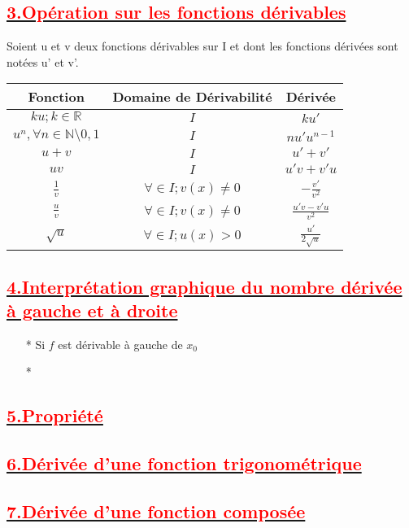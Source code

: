 \documentclass[12pt]{article}
\begin{document}
\subsection*{\underline{\textbf{\textcolor{red}{3.Opération sur les fonctions dérivables}}}}
Soient u et v deux fonctions dérivables sur I et dont les fonctions dérivées sont notées u' et v'.
\begin{center}
\begin{tabular}{|c|c|c|}
\hline
Fonction &Domaine de Dérivabilité &  Dérivée   \\
\hline
$ku;k\in \mathbb{R}$& $I$ & $ku'$ \\
\hline
$u^{n}, \forall n \in \mathbb{N}\setminus{0,1}$ & $I$ &$nu'u^{n-1}$\\
\hline
$u+v$& $I$ & $u'+v'$ \\
\hline
$uv$& $I$ & $u'v+v'u$ \\
\hline
$\frac{1}{v}$& $\forall \in I; v(x) \neq 0$ & $-\frac{v'}{v^{2}}$ \\
\hline
$\frac{u}{v}$& $\forall \in I; v(x) \neq 0$ & $\frac{u'v-v'u}{v^{2}}$ \\
\hline
$\sqrt{u}$& $\forall \in I; u(x) > 0$ & $\frac{u'}{2\sqrt{u}}$ \\
\hline
\end{tabular}
\end{center}
\subsection*{\underline{\textbf{\textcolor{red}{4.Interprétation graphique du nombre dérivée à gauche et à droite}}}}
\begin{itemize}
\item[*]Si $f$ est dérivable à gauche de $x_{0}$
\item[*]
\end{itemize}
\subsection*{\underline{\textbf{\textcolor{red}{5.Propriété}}}}
\subsection*{\underline{\textbf{\textcolor{red}{6.Dérivée d'une fonction trigonométrique}}}}
\subsection*{\underline{\textbf{\textcolor{red}{7.Dérivée d'une fonction composée}}}}
\end{document}
